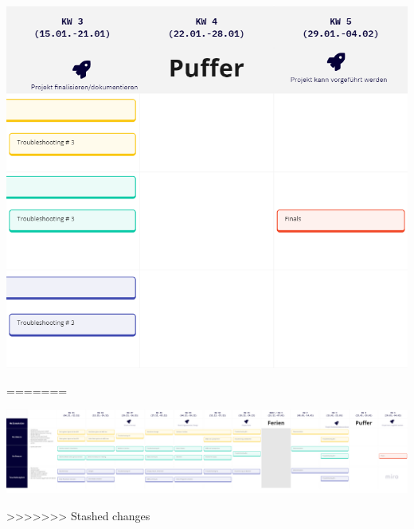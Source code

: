 \documentclass[12pt]{scrartcl}%
\theoremstyle{nonumberplain}
\begin{document}
\begin{flushleft}
 \includegraphics[scale=0.4]{road3.png}
\end{flushleft}
=======
\newpage
\begin{center}
 \includegraphics[scale=0.45, angle=90]{Roadmap_v.2.png}
\end{center}
>>>>>>> Stashed changes
\end{document}
